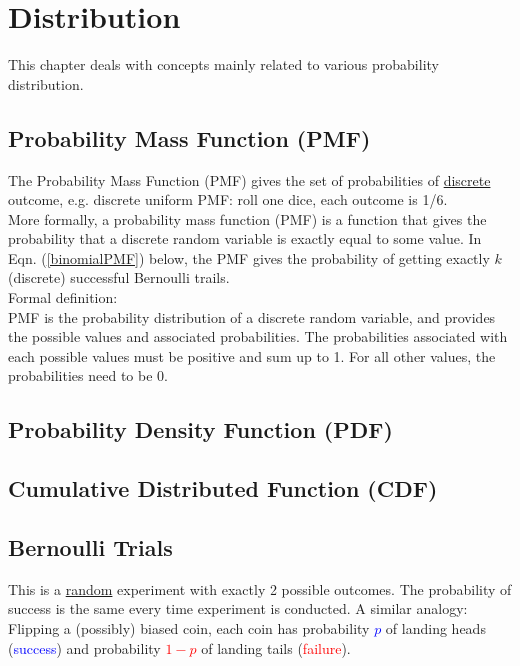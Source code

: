 \graphicspath{%
{chapter1graph/}%
{chapter1graph/bg/}}


\chapter{Distribution}

This chapter deals with concepts mainly related to various probability distribution.

\section{Probability Mass Function (PMF)}

The Probability Mass Function (PMF) gives the set of probabilities of \underline{discrete} outcome, e.g. discrete uniform PMF: roll one dice, each outcome is 1/6. \\

More formally, a probability mass function (PMF) is a function that gives the probability that a discrete random variable is exactly equal to some value. In Eqn. (\ref{binomialPMF}) below, the PMF gives the probability of getting exactly $k$ (discrete) successful Bernoulli trails. \\

Formal definition:\\
PMF is the probability distribution of a discrete random variable, and provides the possible values and associated probabilities. The probabilities associated with each possible values must be positive and sum up to 1. For all other values, the probabilities need to be 0.

\section{Probability Density Function (PDF)}

\section{Cumulative Distributed Function (CDF)}

\section{Bernoulli Trials}

This is a \underline{random} experiment with exactly 2 possible outcomes. The probability of success is the same every time experiment is conducted. A similar analogy: Flipping a (possibly) biased coin, each coin has probability \textcolor{blue}{$p$} of landing heads (\textcolor{blue}{success}) and probability \textcolor{red}{$1 - p$} of landing tails (\textcolor{red}{failure}).  \\

